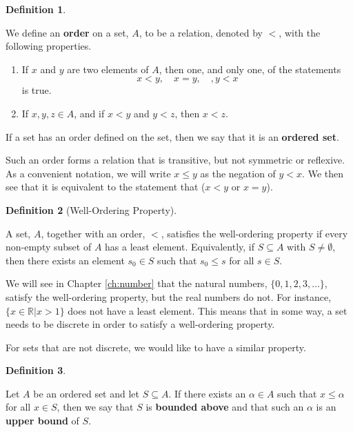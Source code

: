 \documentclass[
]{book}
\providecommand{\tightlist}{%
  \setlength{\itemsep}{0pt}\setlength{\parskip}{0pt}}
\theoremstyle{definition}
\newtheorem{definition}{Definition}[chapter]
\theoremstyle{definition}
\theoremstyle{definition}
\theoremstyle{definition}
\theoremstyle{remark}
\begin{document}
\begin{definition}
\protect\hypertarget{def:order}{}\label{def:order}

We define an \textbf{order} on a set, \(A\), to be a relation, denoted by \(<\), with the following properties.

\begin{enumerate}
\def\labelenumi{\arabic{enumi}.}
\tightlist
\item
  If \(x\) and \(y\) are two elements of \(A\), then one, and only one, of the statements \[x<y, \quad x=y, \quad, y<x\] is true.
\item
  If \(x,y,z \in A\), and if \(x<y\) and \(y<z\), then \(x<z\).
\end{enumerate}

If a set has an order defined on the set, then we say that it is an \textbf{ordered set}.

\end{definition}

Such an order forms a relation that is transitive, but not symmetric or reflexive. As a convenient notation, we will write \(x\leq y\) as the negation of \(y<x\). We then see that it is equivalent to the statement that (\(x<y\) or \(x=y\)).

\begin{definition}[Well-Ordering Property]
\protect\hypertarget{def:well-ordering}{}\label{def:well-ordering}

A set, \(A\), together with an order, \(<\), satisfies the well-ordering property if every non-empty subset of \(A\) has a least element. Equivalently, if \(S\subseteq A\) with \(S\neq \emptyset\), then there exists an element \(s_0\in S\) such that \(s_0 \leq s\) for all \(s\in S\).

\end{definition}

We will see in Chapter \ref{ch:number} that the natural numbers, \(\{0,1,2,3,\ldots\}\), satisfy the well-ordering property, but the real numbers do not. For instance, \(\{x\in \mathbb{R}\vert x>1\}\) does not have a least element. This means that in some way, a set needs to be discrete in order to satisfy a well-ordering property.

For sets that are not discrete, we would like to have a similar property.

\begin{definition}
\protect\hypertarget{def:unlabeled-div-25}{}\label{def:unlabeled-div-25}

Let \(A\) be an ordered set and let \(S\subseteq A\). If there exists an \(\alpha \in A\) such that \(x\leq \alpha\) for all \(x\in S\), then we say that \(S\) is \textbf{bounded above} and that such an \(\alpha\) is an \textbf{upper bound} of \(S\).

\end{definition}
\end{document}
